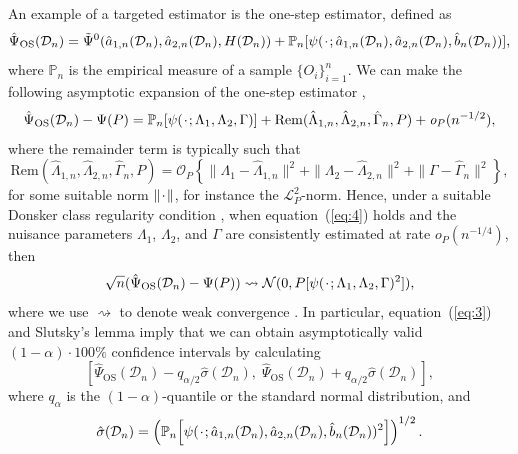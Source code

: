 \documentclass{statsoc}
\numberwithin{theorem}{section}
\newcommand{\blank}{\makebox[1ex]{\textbf{$\cdot$}}}
\newcommand{\weakly}{\rightsquigarrow}
\newcommand\smallO{\textit{o}}
\newcommand{\1}{\mathds{1}}
\newcommand{\empmeas}{\ensuremath{\mathbb{P}_n}} %
\newcommand{\data}{\ensuremath{\mathcal{D}}}
\begin{document}
An example of a targeted estimator is the one-step estimator, defined as
\begin{equation}
    \label{eq:one-step-def}
    \hat{\Psi}_{\text{OS}}(\data_n)
    =
    \tilde{\Psi}^0(\hat{a}_{1,n}(\data_n), \hat{a}_{2,n}(\data_n),
    H(\data_n))
    + \empmeas{[\psi(\blank; \hat{a}_{1,n}(\data_n), \hat{a}_{2,n}(\data_n),
      \hat{b}_n(\data_n) )]},
\end{equation}
where \( \empmeas \) is the empirical measure of a sample \(\{O_i\}_{i=1}^n\).
We can make the following asymptotic expansion of the one-step estimator
\citep{pfanzagl1985contributions,van2003unified,fisher2021visually,kennedy2022semiparametric,rytgaard2022continuous},
\begin{equation*}
  \hat{\Psi}_{\text{OS}}(\data_n)- \Psi(P)
  =  \empmeas{[\psi(\blank ; \Lambda_1, \Lambda_2, \Gamma)]}
  +\mathrm{Rem}{(\hat{\Lambda}_{1,n},\hat{\Lambda}_{2,n},  \hat{\Gamma}_n, P)} + \smallO_{P}(n^{-1/2}),
\end{equation*}
where the remainder term is typically such that
\begin{equation}
  \label{eq:4}
  \mathrm{Rem}{(\hat{\Lambda}_{1,n},\hat{\Lambda}_{2,n},  \hat{\Gamma}_n, P)}
  = \mathcal{O}_P{
    \left\{
      \|\Lambda_1-\hat{\Lambda}_{1,n}\|^2
      +
      \|\Lambda_2-\hat{\Lambda}_{2,n}\|^2
      +
      \|\Gamma-\hat{\Gamma}_{n}\|^2
    \right\}
  },
\end{equation}
for some suitable norm \( \|\blank \| \), for instance the
\( \mathcal{L}_{P}^2 \)-norm. Hence, under a suitable Donsker class regularity
condition \citep{bickel1993efficient,kennedy2016semiparametric}, when
equation~(\ref{eq:4}) holds and the nuisance parameters $\Lambda_1$,
$\Lambda_2$, and $\Gamma$ are consistently estimated at rate
\( \smallO_P{(n^{-1/4})} \), then
\begin{equation}
  \label{eq:3}
  \sqrt{n}(\hat{\Psi}_{\text{OS}}(\data_n)- \Psi(P)) \weakly \mathcal{N}(0,
  P{[\psi(\blank; \Lambda_1, \Lambda_2, \Gamma)^2]}),
\end{equation}
where we use \( \weakly \) to denote weak convergence \citep{van2000asymptotic}.
In particular, equation~(\ref{eq:3}) and Slutsky's lemma imply that we can
obtain asymptotically valid \((1-\alpha)\cdot100\%\) confidence intervals by
calculating
\begin{equation*}
  \left[
    \hat{\Psi}_{\text{OS}}(\data_n) - q_{\alpha/2} \hat{\sigma}(\data_n) ,
    \;
    \hat{\Psi}_{\text{OS}}(\data_n) + q_{\alpha/2} \hat{\sigma}(\data_n)
  \right],
\end{equation*}
where \( q_{\alpha} \) is the \( (1-\alpha) \)-quantile or the standard normal
distribution, and
\begin{equation*}
  \hat{\sigma}(\data_n) = 
  \left(
    \empmeas{
      \left[
        \psi(\blank; \hat{a}_{1,n}(\data_n), \hat{a}_{2,n}(\data_n),
        \hat{b}_n(\data_n))^2
      \right]}
  \right)^{1/2}.
\end{equation*}
\end{document}

